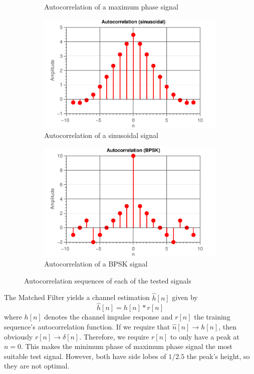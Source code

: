 \documentclass[11pt,titlepage]{report}
\begin{document}
\begin{figure}[H]
\begin{subfigure}{0.49\textwidth}
		\caption{Autocorrelation of a maximum phase signal}
	\end{subfigure}
	\begin{subfigure}{0.49\textwidth}
		\includegraphics[width=\textwidth]{../../deliverable-7-resources/figures/ass-1/report-8-9-10/report-8/ass-1-report-8-sinusoidal-sinusoidal.pdf}
		\caption{Autocorrelation of a sinusoidal signal}
	\end{subfigure}
	\begin{subfigure}{0.49\textwidth}
		\includegraphics[width=\textwidth]{../../deliverable-7-resources/figures/ass-1/report-8-9-10/report-8/ass-1-report-8-BPSK-BPSK.pdf}
		\caption{Autocorrelation of a BPSK signal}
	\end{subfigure}
	\caption{Autocorrelation sequences of each of the tested signals}
	\label{fig:ass-1-rep-8}
\end{figure}

The Matched Filter yields a channel estimation $\hat{h}[n]$ given by
\[
	\hat{h}[n] = h[n] \ast r[n]
\]
where $h[n]$ denotes the channel impulse response and $r[n]$ the training sequence's autocorrelation function. If we require that $\hat{n}[n] \rightarrow h[n]$, then obviously $r[n] \rightarrow \delta[n]$. Therefore, we require $r[n]$ to only have a peak at $n=0$. This makes the minimum phase of maximum phase signal the most suitable test signal. However, both have side lobes of $1/2.5$ the peak's height, so they are not optimal.
 
\end{document}
